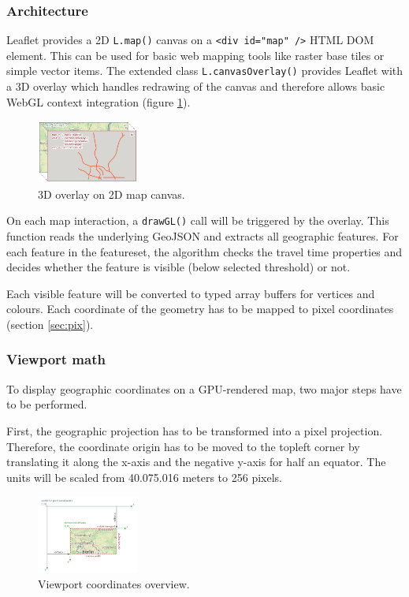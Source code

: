 \documentclass{motivation}
\begin{document}
\subsubsection{Architecture}
  Leaflet provides a 2D \texttt{L.map()} canvas on a \texttt{<div id="map" />} HTML DOM element. This can be used for basic web mapping tools like raster base tiles or simple vector items. The extended class \texttt{L.canvasOverlay()} provides Leaflet with a 3D overlay which handles redrawing of the canvas and therefore allows basic WebGL context integration (figure \ref{fig:overlay}).

  \begin{figure}[h]
    \centering
    \includegraphics[width=0.3\textwidth]{../pdf/canvasoverlay.pdf}
    \caption{3D overlay on 2D map canvas.}
    \label{fig:overlay}
  \end{figure}

  On each map interaction, a \texttt{drawGL()} call will be triggered by the overlay. This function reads the underlying GeoJSON and extracts all geographic features. For each feature in the featureset, the algorithm checks the travel time properties and decides whether the feature is visible (below selected threshold) or not.\par
  Each visible feature will be converted to typed array buffers for vertices and colours. Each coordinate of the geometry has to be mapped to pixel coordinates (section \ref{sec:pix}).

\subsubsection{Viewport math}
  To display geographic coordinates on a GPU-rendered map, two major steps have to be performed.\par
  First, the geographic projection has to be transformed into a pixel projection. Therefore, the coordinate origin has to be moved to the topleft corner by translating it along the x-axis and the negative y-axis for half an equator. The units will be scaled from 40.075.016 meters to 256 pixels.

  \begin{figure}[h]
    \centering
    \includegraphics[width=0.3\textwidth]{../pdf/viewport.pdf}
    \caption{Viewport coordinates overview.}
    \label{fig:viewport}
  \end{figure}
\end{document}
